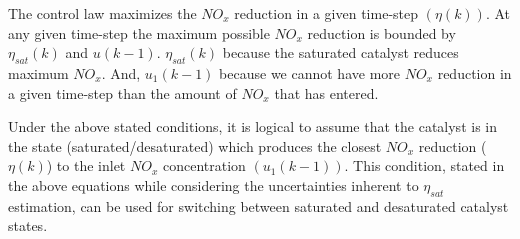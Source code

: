 The control law maximizes the $NO_x$ reduction in a given time-step $(\eta(k))$. At any given time-step the maximum
possible $NO_x$ reduction is bounded by $\eta_{sat}(k)$ and $u(k-1)$. $\eta_{sat}(k)$ because the saturated catalyst
reduces maximum $NO_x$. And, $u_1(k-1)$ because we cannot have more $NO_x$ reduction in a given time-step than the
amount of $NO_x$ that has entered.

Under the above stated conditions, it is logical to assume that the catalyst is in the state (saturated/desaturated)
which produces the closest $NO_x$ reduction ($\eta(k)$) to the inlet $NO_x$ concentration $(u_1(k-1))$. This condition,
stated in the above equations while considering the uncertainties inherent to $\eta_{sat}$ estimation, can be used for
switching between saturated and desaturated catalyst states.



